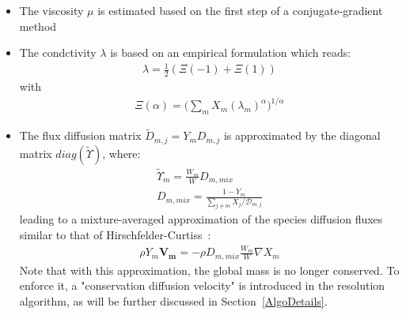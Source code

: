 \begin{itemize}
\item The viscosity $\mu$ is estimated based on the first step of a conjugate-gradient method 
\item The condctivity $\lambda$ is based on an empirical formulation which reads:
\begin{eqnarray}
\lambda = \frac{1}{2} (\Xi(-1) + \Xi(1))
\end{eqnarray}
with
\begin{eqnarray}
\Xi(\alpha) = \Big( \sum_m X_m (\lambda_m)^{\alpha} \Big)^{1/\alpha}
\end{eqnarray}
\item The flux diffusion matrix ${\widetilde{D}_{m,j}} = Y_m D_{m,j}$ is approximated by the diagonal matrix $diag(\widetilde{ \Upsilon})$, where:
\begin{eqnarray}
\widetilde{ \Upsilon}_m = \frac{W_m}{W} D_{m,mix}
\\
 D_{m,mix} = \frac{1-Y_m}{ \sum_{j \neq m} X_j / \mathcal{D}_{m,j}}
\end{eqnarray}
leading to a mixture-averaged approximation of the species diffusion fluxes similar to that of Hirschfelder-Curtiss~\cite{Hirschfelder:1954}:
\begin{eqnarray}
\rho Y_m \boldsymbol{V_m} = - \rho D_{m,mix} \frac{W_m}{W} \nabla X_m 
\end{eqnarray}
Note that with this approximation, the global mass is no longer conserved. To enforce it, a "conservation diffusion velocity" is introduced in the resolution algorithm, as will be further discussed in Section~\ref{AlgoDetails}.
\end{itemize}


